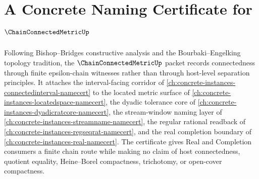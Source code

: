 \chapter{A Concrete Naming Certificate for $\ChainConnectedMetricUp$}
\label{ch:concrete-instances-chain-connected-metric-namecert}

Following Bishop--Bridges constructive analysis and the Bourbaki--Engelking topology tradition, the $\ChainConnectedMetricUp$ packet records connectedness through finite epsilon-chain witnesses rather than through host-level separation principles. It attaches the interval-facing corridor of \autoref{ch:concrete-instances-connectedinterval-namecert} to the located metric surface of \autoref{ch:concrete-instances-locatedspace-namecert}, the dyadic tolerance core of \autoref{ch:concrete-instances-dyadicratcore-namecert}, the stream-window naming layer of \autoref{ch:concrete-instances-streamname-namecert}, the regular rational readback of \autoref{ch:concrete-instances-regseqrat-namecert}, and the real completion boundary of \autoref{ch:concrete-instances-real-namecert}. The certificate gives Real and Completion consumers a finite chain route while making no claim of host connectedness, quotient equality, Heine--Borel compactness, trichotomy, or open-cover compactness.

